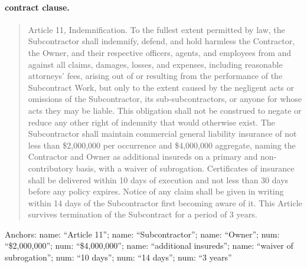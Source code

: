 \paragraph{contract clause.}
\begin{quote}\small Article 11, Indemnification. To the fullest extent permitted by law, the Subcontractor shall indemnify, defend, and hold harmless the Contractor, the Owner, and their respective officers, agents, and employees from and against all claims, damages, losses, and expenses, including reasonable attorneys' fees, arising out of or resulting from the performance of the Subcontract Work, but only to the extent caused by the negligent acts or omissions of the Subcontractor, its sub-subcontractors, or anyone for whose acts they may be liable. This obligation shall not be construed to negate or reduce any other right of indemnity that would otherwise exist. The Subcontractor shall maintain commercial general liability insurance of not less than \$2,000,000 per occurrence and \$4,000,000 aggregate, naming the Contractor and Owner as additional insureds on a primary and non-contributory basis, with a waiver of subrogation. Certificates of insurance shall be delivered within 10 days of execution and not less than 30 days before any policy expires. Notice of any claim shall be given in writing within 14 days of the Subcontractor first becoming aware of it. This Article survives termination of the Subcontract for a period of 3 years.\end{quote}
\noindent\footnotesize Anchors: name: ``Article 11''; name: ``Subcontractor''; name: ``Owner''; num: ``\$2,000,000''; num: ``\$4,000,000''; name: ``additional insureds''; name: ``waiver of subrogation''; num: ``10 days''; num: ``14 days''; num: ``3 years''\normalsize

